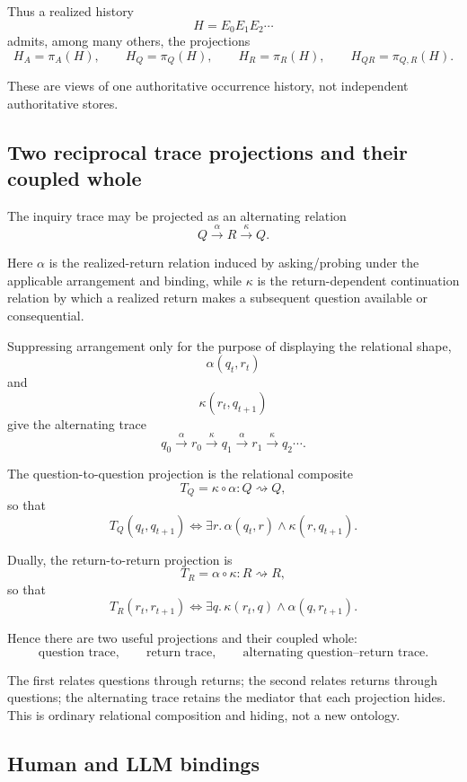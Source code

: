 Thus a realized history
\[
H=E_0E_1E_2\cdots
\]
admits, among many others, the projections
\[
H_A=\pi_A(H),
\qquad
H_Q=\pi_Q(H),
\qquad
H_R=\pi_R(H),
\qquad
H_{QR}=\pi_{Q,R}(H).
\]

These are views of one authoritative occurrence history, not independent
authoritative stores.

\subsection{Two reciprocal trace projections and their coupled whole}

The inquiry trace may be projected as an alternating relation
\[
\boxed{
Q\xrightarrow{\alpha}R\xrightarrow{\kappa}Q.
}
\]

Here \(\alpha\) is the realized-return relation induced by asking/probing under
the applicable arrangement and binding, while \(\kappa\) is the
return-dependent continuation relation by which a realized return makes a
subsequent question available or consequential.

Suppressing arrangement only for the purpose of displaying the relational
shape,
\[
\alpha(q_t,r_t)
\]
and
\[
\kappa(r_t,q_{t+1})
\]
give the alternating trace
\[
q_0\xrightarrow{\alpha}r_0
\xrightarrow{\kappa}q_1
\xrightarrow{\alpha}r_1
\xrightarrow{\kappa}q_2\cdots.
\]

The question-to-question projection is the relational composite
\[
\boxed{
T_Q=\kappa\circ\alpha:Q\rightsquigarrow Q,
}
\]
so that
\[
T_Q(q_t,q_{t+1})
\iff
\exists r.\,
\alpha(q_t,r)\land\kappa(r,q_{t+1}).
\]

Dually, the return-to-return projection is
\[
\boxed{
T_R=\alpha\circ\kappa:R\rightsquigarrow R,
}
\]
so that
\[
T_R(r_t,r_{t+1})
\iff
\exists q.\,
\kappa(r_t,q)\land\alpha(q,r_{t+1}).
\]

Hence there are two useful projections and their coupled whole:
\[
\boxed{
\text{question trace},
\qquad
\text{return trace},
\qquad
\text{alternating question--return trace}.
}
\]

The first relates questions through returns; the second relates returns
through questions; the alternating trace retains the mediator that each
projection hides.  This is ordinary relational composition and hiding, not a
new ontology.

\subsection{Human and LLM bindings}

